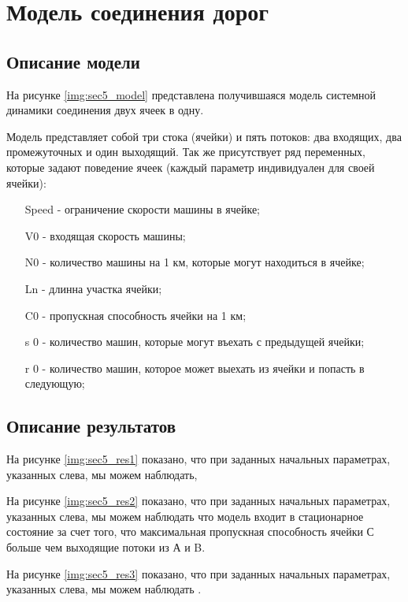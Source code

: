 \section{Модель соединения дорог}

\subsection{Описание модели}

На рисунке \ref{img:sec5_model} представлена получившаяся модель системной динамики соединения двух ячеек в одну.

Модель представляет собой три стока (ячейки) и пять потоков: два входящих, два промежуточных и один выходящий.
Так же присутствует ряд переменных, которые задают поведение ячеек (каждый параметр индивидуален для своей ячейки):
\begin{itemize}
    \item[Speed] - ограничение скорости машины в ячейке;
    \item[V0] - входящая скорость машины;
    \item[N0] - количество машины на 1 км, которые могут находиться в ячейке;
    \item[Ln] - длинна участка ячейки;
    \item[C0] - пропускная способность ячейки на 1 км;
    \item[s 0] - количество машин, которые могут въехать с предыдущей ячейки;
    \item[r 0] - количество машин, которое может выехать из ячейки и попасть в следующую;
\end{itemize}


\subsection{Описание результатов}

На рисунке \ref{img:sec5_res1} показано, что при заданных начальных параметрах, указанных слева, мы можем наблюдать, 


На рисунке \ref{img:sec5_res2} показано, что при заданных начальных параметрах, указанных слева, мы можем наблюдать что модель входит в стационарное состояние за счет того, что максимальная пропускная способность ячейки С больше чем выходящие потоки из А и B.


На рисунке \ref{img:sec5_res3} показано, что при заданных начальных параметрах, указанных слева, мы можем наблюдать .


\clearpage